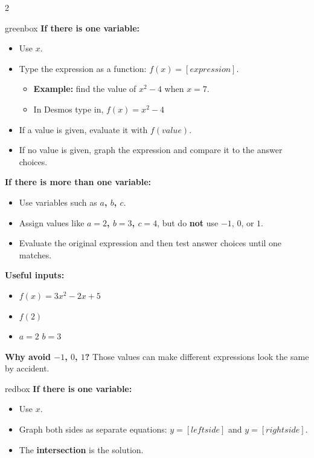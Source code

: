 \documentclass[10pt]{article}
\begin{document}
    \begin{multicols}{2}
        \begin{skillbox}{greenbox}
            \textbf{If there is one variable:}
            \begin{itemize}
                \item Use \textbf{$x$}.
                \item Type the expression as a function: $f(x)= [expression]$.
                \begin{itemize}
                    \item \textbf{Example:} find the value of $x^2-4$ when $x=7$.
                    \item In Desmos type in, $f(x)=x^2-4$
                \end{itemize}
                \item If a value is given, evaluate it with $f(value)$.
                \item If no value is given, graph the expression and compare it to the answer choices.
            \end{itemize}
            \textbf{If there is more than one variable:}
            \begin{itemize}
                \item Use variables such as \textbf{$a$, $b$, $c$}.
                \item Assign values like \textbf{$a=2$, $b=3$, $c=4$},
                but do \textbf{not} use $-1$, $0$, or $1$.
                \item Evaluate the original expression and then test answer choices until one matches.
            \end{itemize}

            \textbf{Useful inputs:}
            \begin{itemize}
                \item \textbf{$ f(x)=3x^2-2x+5 $}
                \item \textbf{$ f(2) $}
                \item $a=2$ \hspace{1em} $b=3$
            \end{itemize}

            \textbf{Why avoid $-1$, $0$, $1$?} Those values can make different expressions look the same by accident.
        \end{skillbox}

        \begin{skillbox}{redbox}
            \textbf{If there is one variable:}
            \begin{itemize}[noitemsep, topsep=0pt]
                \item Use \textbf{$x$}.
                \item Graph both sides as separate equations: $y=[left side]$ and $y=[right side]$.
                \item The \textbf{intersection} is the solution.
            \end{itemize}


\end{skillbox}
\end{multicols}
\end{document}
